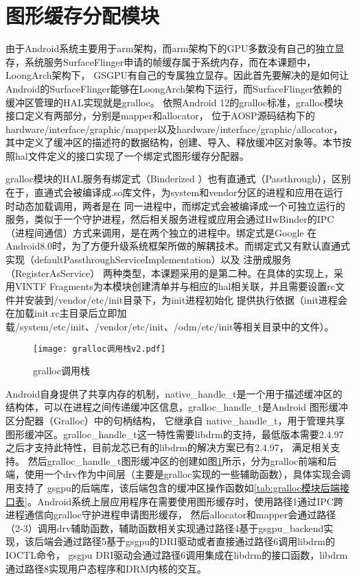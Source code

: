 \section{图形缓存分配模块}
由于Android系统主要用于arm架构，而arm架构下的GPU多数没有自己的独立显存，系统服务SurfaceFlinger申请的帧缓存属于系统内存，而在本课题中，LoongArch架构下，
GSGPU有自己的专属独立显存。因此首先要解决的是如何让Android的SurfaceFlinger能够在LoongArch架构下运行，而SurfaceFlinger依赖的缓冲区管理的HAL实现就是gralloc。
依照Android 12的gralloc标准，gralloc模块接口定义有两部分，分别是mapper和allocator，
位于AOSP源码结构下的hardware/interface/graphic/mapper以及hardware/interface/graphic/allocator，
其中定义了缓冲区的描述符的数据结构，创建、导入、释放缓冲区对象等。本节按照hal文件定义的接口实现了一个绑定式图形缓存分配器。

gralloc模块的HAL服务有绑定式（Binderized ）也有直通式（Passthrough），区别在于，直通式会被编译成.so库文件，为system和vendor分区的进程和应用在运行时动态加载调用，两者是在
同一进程中，而绑定式会被编译成一个可独立运行的服务，类似于一个守护进程，然后相关服务进程或应用会通过HwBinder的IPC（进程间通信）方式来调用，是在两个独立的进程中。绑定式是Google
在Android8.0时，为了方便升级系统框架所做的解耦技术。而绑定式又有默认直通式实现（defaultPassthroughServiceImplementation）以及 注册成服务（RegisterAsService）
两种类型，本课题采用的是第二种。在具体的实现上，采用VINTF Fragments为本模块创建清单并与相应的hal相关联，并且需要设置rc文件并安装到/vendor/etc/init目录下，为init进程初始化
提供执行依据（init进程会在加载init.rc主目录后立即加载/system/etc/init、/vendor/etc/init、/odm/etc/init等相关目录中的文件）。

\begin{figure}[h]
  \centering
  \texttt{[image: gralloc调用栈v2.pdf]}
  \caption{gralloc调用栈}
  \label{fig:gralloc调用栈}
\end{figure}

Android自身提供了共享内存的机制，native\_handle\_t是一个用于描述缓冲区的结构体，可以在进程之间传递缓冲区信息，gralloc\_handle\_t是Android 图形缓冲区分配器（Gralloc）中的句柄结构，
它继承自 native\_handle\_t，用于管理共享图形缓冲区。gralloc\_handle\_t这一特性需要libdrm的支持，最低版本需要2.4.97之后才支持此特性，目前龙芯已有的libdrm的解决方案已有2.4.97，
满足相关支持。
然后gralloc\_handle\_t图形缓冲区的创建如图\ref{fig:gralloc调用栈}所示，分为gralloc前端和后端，使用一个drv作为中间层（主要是gralloc实现的一些辅助函数），具体实现会调用支持了
gsgpu的后端库，该后端包含的缓冲区操作函数如\ref{tab:gralloc模块后端接口表}。Android系统上层应用程序在需要使用图形缓存时，使用路径1通过IPC跨进程通信向gralloc守护进程申请图形缓存，
然后allocator和mapper会通过路径（2-3）调用drv辅助函数，辅助函数相关实现通过路径4基于gsgpu\_backend实现，该后端会通过路径5基于gsgpu的DRI驱动或者直接通过路径6调用libdrm的IOCTL命令，
gsgpu DRI驱动会通过路径6调用集成在libdrm的接口函数，libdrm通过路径8实现用户态程序和DRM内核的交互。

